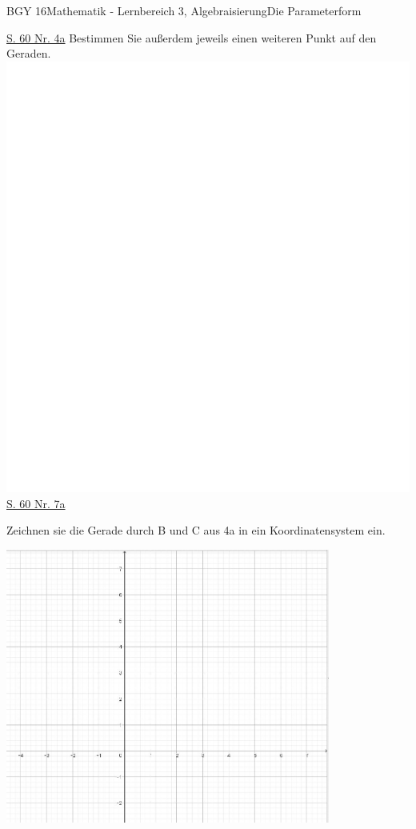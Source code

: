 \documentclass[oneside,openany,headings=optiontotoc,11pt,numbers=noenddot]{scrreprt}
\begin{document}
	\begin{worksheet}{BGY 16}{Mathematik - Lernbereich 3, Algebraisierung}{Die Parameterform}
		
		\begin{framed}
			\noindent
			\underline{S. 60 Nr. 4a} Bestimmen Sie außerdem jeweils einen weiteren Punkt auf den Geraden.\\
			\includegraphics[scale=0.58]{../empty.jpg}\\
			\underline{S. 60 Nr. 7a}
		\end{framed}		
		\begin{framed}
			\noindent
			Zeichnen sie die Gerade durch B und C aus 4a in ein Koordinatensystem ein.
			\begin{center}
				\includegraphics[width=0.8\textwidth]{Bilder/Koord.jpg}\\
			\end{center}
		\end{framed}
		

\end{worksheet}
\end{document}
